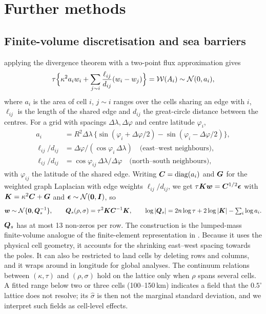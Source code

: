 \section{Further methods}\label{supp:methods-more}

\subsection{Finite-volume discretisation and sea barriers}\label{supp:methods-fv}

applying the divergence theorem with a two-point flux approximation gives
\[
\tau\Bigl\{\kappa^2 a_i w_i + \sum_{j \sim i} \frac{\ell_{ij}}{d_{ij}}(w_i - w_j)\Bigr\}
= \mathcal{W}(A_i) \sim \mathcal{N}(0, a_i),
\]
where $a_i$ is the area of cell $i$, $j \sim i$ ranges over the cells sharing an
edge with $i$, $\ell_{ij}$ is the length of the shared edge and $d_{ij}$ the
great-circle distance between the centres. For a grid with spacings
$\Delta\lambda, \Delta\varphi$ and centre latitude $\varphi_i$,
\begin{align*}
a_i &= R^2 \Delta\lambda\,\{\sin(\varphi_i + \Delta\varphi/2) - \sin(\varphi_i - \Delta\varphi/2)\},\\
\ell_{ij}/d_{ij} &= \Delta\varphi / (\cos\varphi_i\, \Delta\lambda) \quad \text{(east--west neighbours)},\\
\ell_{ij}/d_{ij} &= \cos\varphi_{ij}\,\Delta\lambda / \Delta\varphi \quad \text{(north--south neighbours)},
\end{align*}
with $\varphi_{ij}$ the latitude of the shared edge. Writing
$\bm{C} = \mathrm{diag}(a_i)$ and $\bm{G}$ for the weighted graph Laplacian with edge
weights $\ell_{ij}/d_{ij}$, we get $\tau \bm{K} \bm{w} = \bm{C}^{1/2}\bm{\epsilon}$ with
$\bm{K} = \kappa^2 \bm{C} + \bm{G}$ and $\bm{\epsilon} \sim \mathcal{N}(\bm{0}, \bm{I})$, so
\begin{equation}\label{eq:Qs}
\bm{w} \sim \mathcal{N}\{\bm{0}, \bm{Q}_s^{-1}\}, \qquad
\bm{Q}_s(\rho, \sigma) = \tau^2 \bm{K} \bm{C}^{-1} \bm{K},
\qquad
\log|\bm{Q}_s| = 2n\log\tau + 2\log|\bm{K}| - \textstyle\sum_i \log a_i .
\end{equation}
$\bm{Q}_s$ has at most 13 non-zeros per row. The construction is the lumped-mass
finite-volume analogue of the finite-element representation in
\citet{lindgren2011spde}. Because it uses the physical cell geometry, it accounts
for the shrinking east--west spacing towards the poles. It can also be restricted to
land cells by deleting rows and columns, and it wraps around in longitude for global
analyses. The continuum relations between $(\kappa, \tau)$ and $(\rho, \sigma)$
hold on the lattice only when $\rho$ spans several cells. A fitted range below two
or three cells (100--150\,km) indicates a field that the $0.5^\circ$ lattice does
not resolve; its $\hat\sigma$ is then not the marginal standard deviation, and we
interpret such fields as cell-level effects.

